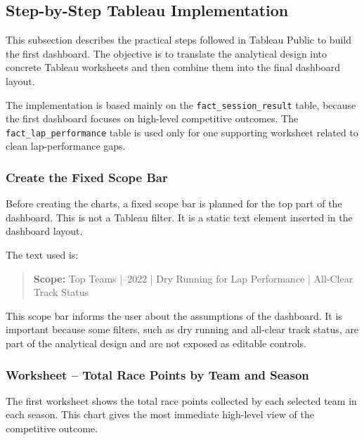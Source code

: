 \documentclass[12pt,a4paper]{article}
\begin{document}
	\subsection{Step-by-Step Tableau Implementation}
	
	This subsection describes the practical steps followed in Tableau Public to build the first dashboard.
	The objective is to translate the analytical design into concrete Tableau worksheets and then combine them into the final dashboard layout.
	
	The implementation is based mainly on the \texttt{fact\_session\_result} table, because the first dashboard focuses on high-level competitive outcomes.
	The \texttt{fact\_lap\_performance} table is used only for one supporting worksheet related to clean lap-performance gaps.
	

	\subsubsection{Create the Fixed Scope Bar}
	
	Before creating the charts, a fixed scope bar is planned for the top part of the dashboard.
	This is not a Tableau filter.
	It is a static text element inserted in the dashboard layout.
	
	The text used is:
	
	\begin{quote}
		\textbf{Scope:} Top Teams \;|--2022 \;|\; Dry Running for Lap Performance \;|\; All-Clear Track Status
	\end{quote}
	
	This scope bar informs the user about the assumptions of the dashboard.
	It is important because some filters, such as dry running and all-clear track status, are part of the analytical design and are not exposed as editable controls.
	
	\subsubsection{Worksheet -- Total Race Points by Team and Season}
	
	The first worksheet shows the total race points collected by each selected team in each season.
	This chart gives the most immediate high-level view of the competitive outcome.
	
\end{document}

